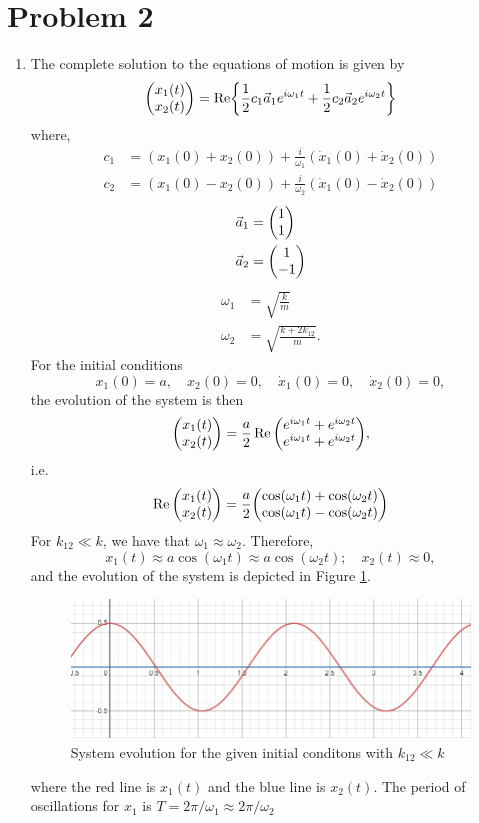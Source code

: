 \documentclass[12pt]{article}
\begin{document}
\section*{Problem 2}
\begin{enumerate}[label=\roman*.]
    \item The complete solution to the equations of motion is given by
    \[ \mqty(x_1(t)\\x_2(t)) = \Re{\frac{1}{2}c_1\vec{a}_1e^{i\omega_1 t} + \frac{1}{2}c_2\vec{a}_2e^{i\omega_2 t}} \]
    where,
    \begin{align*}
        c_1 &= (x_1(0) + x_2(0)) + \frac{i}{\omega_1}(\dot{x}_1(0) + \dot{x}_2(0)) \\
        c_2 &= (x_1(0) - x_2(0)) + \frac{i}{\omega_2}(\dot{x}_1(0) - \dot{x}_2(0))
    \end{align*}
    \begin{align*}
        \vec{a}_1 &= \mqty(1\\1) \\
        \vec{a}_2 &= \mqty(1\\-1)
    \end{align*}
    \begin{align*}
        \omega_1 &= \sqrt{\frac{k}{m}} \\
        \omega_2 &= \sqrt{\frac{k + 2k_{12}}{m}}.
    \end{align*}
    For the initial conditions
    \[ x_1(0) = a, \quad x_2(0) = 0, \quad \dot{x}_1(0) = 0, \quad \dot{x}_2(0) = 0, \]
    the evolution of the system is then
    \[ \mqty(x_1(t)\\x_2(t)) = \frac{a}{2}\Re\mqty(e^{i\omega_1 t} + e^{i\omega_2 t} \\ e^{i\omega_1 t} + e^{i\omega_2 t} ), \]
    i.e.
    \[ \Re \mqty(x_1(t)\\x_2(t)) = \frac{a}{2}\mqty(\cos(\omega_1 t) + \cos(\omega_2 t) \\ \cos(\omega_1 t) - \cos(\omega_2 t)) \]
    For $k_{12} \ll k$, we have that $\omega_1 \approx \omega_2$. Therefore, 
    \[ x_1(t) \approx a\cos(\omega_1 t) \approx a\cos(\omega_2 t); \quad x_2(t) \approx 0, \]
    and the evolution of the system is depicted in Figure \ref{fig1}.
    \begin{figure}[H]
        \includegraphics[scale=0.75]{fig1}
        \centering
        \caption{System evolution for the given initial conditons with $k_{12} \ll k$}
        \label{fig1}
    \end{figure}
    where the red line is $x_1(t)$ and the blue line is $x_2(t)$. The period of oscillations for $x_1$ is $\boxed{T = 2\pi/\omega_{1} \approx 2\pi/\omega_2}$


\end{enumerate}
\end{document}

